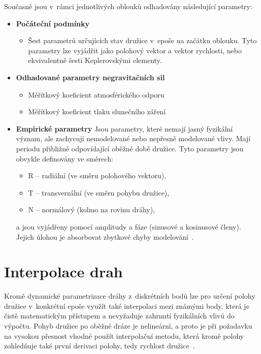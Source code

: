 \noindent Současně jsou v~rámci jednotlivých oblouků odhadovány následující parametry:

\begin{itemize}

\item \textbf{Počáteční podmínky}
\begin{itemize}
\item Šest parametrů určujících stav družice v~epoše na začátku oblouku. Tyto parametry lze vyjádřit jako polohový vektor a vektor rychlosti, nebo ekvivalentně šesti Keplerovskými elementy.
\end{itemize}

\item \textbf{Odhadované parametry negravitačních sil}
\begin{itemize}
\item Měřítkový koeficient atmosférického odporu
\item Měřítkový koeficient tlaku slunečního záření
\end{itemize}

\item \textbf{Empirické parametry}
Jsou parametry, které nemají jasný fyzikální význam, ale zachycují nemodelované nebo nepřesně modelované vlivy. Mají periodu přibližně odpovídající oběžné době družice. Tyto parametry jsou obvykle definovány ve směrech:
\begin{itemize}
\item R -- radiální (ve směru polohového vektoru),
\item T -- transverzální (ve směru pohybu družice),
\item N -- normálový (kolmo na rovinu dráhy),
\end{itemize}
a jsou vyjádřeny pomocí amplitudy a fáze (sinusové a kosinusové členy). Jejich úlohou je absorbovat zbytkové chyby modelování~\cite{stepanek_2023_gop_itrf2020}.

\end{itemize}

\section{Interpolace drah}

Kromě dynamické parametrizace dráhy z~diskrétních bodů lze pro určení polohy družice v~konkrétní epoše využít také interpolaci mezi známými body, která je čistě matematickým přístupem a nevyžaduje zahrnutí fyzikálních vlivů do výpočtu. Pohyb družice po oběžné dráze je nelineární, a proto je při požadavku na vysokou přesnost vhodné použít interpolační metodu, která kromě polohy zohledňuje také první derivaci polohy, tedy rychlost družice~\cite{zeitlhoefler_2024_interpolation}.

